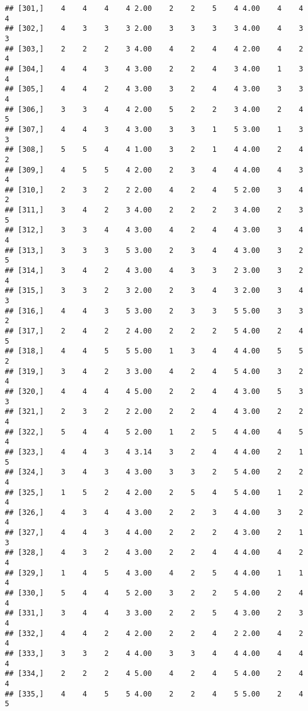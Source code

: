 \documentclass[]{article}
\begin{document}
\begin{verbatim}
## [301,]    4    4    4    4 2.00    2    2    5    4 4.00    4    4    4
## [302,]    4    3    3    3 2.00    3    3    3    3 4.00    4    3    3
## [303,]    2    2    2    3 4.00    4    2    4    4 2.00    4    2    4
## [304,]    4    4    3    4 3.00    2    2    4    3 4.00    1    3    4
## [305,]    4    4    2    4 3.00    3    2    4    4 3.00    3    3    4
## [306,]    3    3    4    4 2.00    5    2    2    3 4.00    2    4    5
## [307,]    4    4    3    4 3.00    3    3    1    5 3.00    1    3    3
## [308,]    5    5    4    4 1.00    3    2    1    4 4.00    2    4    2
## [309,]    4    5    5    4 2.00    2    3    4    4 4.00    4    3    4
## [310,]    2    3    2    2 2.00    4    2    4    5 2.00    3    4    2
## [311,]    3    4    2    3 4.00    2    2    2    3 4.00    2    3    5
## [312,]    3    3    4    4 3.00    4    2    4    4 3.00    3    4    4
## [313,]    3    3    3    5 3.00    2    3    4    4 3.00    3    2    5
## [314,]    3    4    2    4 3.00    4    3    3    2 3.00    3    2    4
## [315,]    3    3    2    3 2.00    2    3    4    3 2.00    3    4    3
## [316,]    4    4    3    5 3.00    2    3    3    5 5.00    3    3    2
## [317,]    2    4    2    2 4.00    2    2    2    5 4.00    2    4    5
## [318,]    4    4    5    5 5.00    1    3    4    4 4.00    5    5    2
## [319,]    3    4    2    3 3.00    4    2    4    5 4.00    3    2    4
## [320,]    4    4    4    4 5.00    2    2    4    4 3.00    5    3    3
## [321,]    2    3    2    2 2.00    2    2    4    4 3.00    2    2    4
## [322,]    5    4    4    5 2.00    1    2    5    4 4.00    4    5    4
## [323,]    4    4    3    4 3.14    3    2    4    4 4.00    2    1    5
## [324,]    3    4    3    4 3.00    3    3    2    5 4.00    2    2    4
## [325,]    1    5    2    4 2.00    2    5    4    5 4.00    1    2    4
## [326,]    4    3    4    4 3.00    2    2    3    4 4.00    3    2    4
## [327,]    4    4    3    4 4.00    2    2    2    4 3.00    2    1    3
## [328,]    4    3    2    4 3.00    2    2    4    4 4.00    4    2    4
## [329,]    1    4    5    4 3.00    4    2    5    4 4.00    1    1    4
## [330,]    5    4    4    5 2.00    3    2    2    5 4.00    2    4    4
## [331,]    3    4    4    3 3.00    2    2    5    4 3.00    2    3    4
## [332,]    4    4    2    4 2.00    2    2    4    2 2.00    4    2    4
## [333,]    3    3    2    4 4.00    3    3    4    4 4.00    4    4    4
## [334,]    2    2    2    4 5.00    4    2    4    5 4.00    2    4    4
## [335,]    4    4    5    5 4.00    2    2    4    5 5.00    2    4    5

\end{verbatim}
\end{document}
